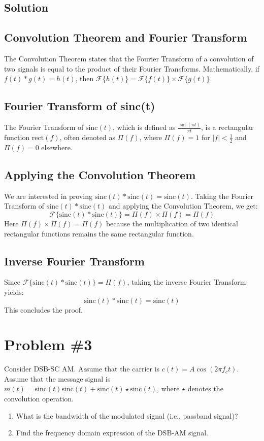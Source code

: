\documentclass{article}
\begin{document}
\subsection*{Solution}
\subsection*{Convolution Theorem and Fourier Transform}
The Convolution Theorem states that the Fourier Transform of a convolution of two signals is equal to the product of their Fourier Transforms. Mathematically, if \( f(t) * g(t) = h(t) \), then \( \mathcal{F}\{ h(t) \} = \mathcal{F}\{ f(t) \} \times \mathcal{F}\{ g(t) \} \).

\subsection*{Fourier Transform of sinc(t)}
The Fourier Transform of \( \text{sinc}(t) \), which is defined as \( \frac{\sin(\pi t)}{\pi t} \), is a rectangular function \( \text{rect}(f) \), often denoted as \( \Pi(f) \), where \( \Pi(f) = 1 \) for \( |f| < \frac{1}{2} \) and \( \Pi(f) = 0 \) elsewhere.

\subsection*{Applying the Convolution Theorem}
We are interested in proving \( \text{sinc}(t) * \text{sinc}(t) = \text{sinc}(t) \).
\newline \newline
Taking the Fourier Transform of \( \text{sinc}(t) * \text{sinc}(t) \) and applying the Convolution Theorem, we get:
\[
\mathcal{F}\{ \text{sinc}(t) * \text{sinc}(t) \} = \Pi(f) \times \Pi(f) = \Pi(f)
\]
Here \( \Pi(f) \times \Pi(f) = \Pi(f) \) because the multiplication of two identical rectangular functions remains the same rectangular function.

\subsection*{Inverse Fourier Transform}
Since \( \mathcal{F}\{ \text{sinc}(t) * \text{sinc}(t) \} = \Pi(f) \), taking the inverse Fourier Transform yields:
\[
\text{sinc}(t) * \text{sinc}(t) = \text{sinc}(t)
\]
This concludes the proof.

\newpage
\section*{Problem \#3}
Consider DSB-SC AM. Assume that the carrier is \( c(t) = A \cos(2\pi f_c t) \). Assume that the message signal is \( m(t) = \text{sinc}(t)\text{sinc}(t) + \text{sinc}(t) \star \text{sinc}(t) \), where \( \star \) denotes the convolution operation. 
\begin{enumerate}
    \item What is the bandwidth of the modulated signal (i.e., passband signal)?
    \item Find the frequency domain expression of the DSB-AM signal.
\end{enumerate}
\end{document}
